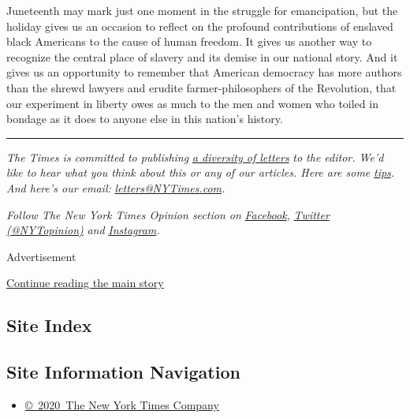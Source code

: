 Juneteenth may mark just one moment in the struggle for emancipation,
but the holiday gives us an occasion to reflect on the profound
contributions of enslaved black Americans to the cause of human freedom.
It gives us another way to recognize the central place of slavery and
its demise in our national story. And it gives us an opportunity to
remember that American democracy has more authors than the shrewd
lawyers and erudite farmer-philosophers of the Revolution, that our
experiment in liberty owes as much to the men and women who toiled in
bondage as it does to anyone else in this nation's history.

\begin{center}\rule{0.5\linewidth}{\linethickness}\end{center}

\emph{The Times is committed to publishing}
\href{https://www.nytimes3xbfgragh.onion/2019/01/31/opinion/letters/letters-to-editor-new-york-times-women.html}{\emph{a
diversity of letters}} \emph{to the editor. We'd like to hear what you
think about this or any of our articles. Here are some}
\href{https://help.nytimes3xbfgragh.onion/hc/en-us/articles/115014925288-How-to-submit-a-letter-to-the-editor}{\emph{tips}}\emph{.
And here's our email:}
\href{mailto:letters@NYTimes.com}{\emph{letters@NYTimes.com}}\emph{.}

\emph{Follow The New York Times Opinion section on}
\href{https://www.facebookcorewwwi.onion/nytopinion}{\emph{Facebook}}\emph{,}
\href{http://twitter.com/NYTOpinion}{\emph{Twitter (@NYTopinion)}}
\emph{and}
\href{https://www.instagram.com/nytopinion/}{\emph{Instagram}}\emph{.}

Advertisement

\protect\hyperlink{after-bottom}{Continue reading the main story}

\hypertarget{site-index}{%
\subsection{Site Index}\label{site-index}}

\hypertarget{site-information-navigation}{%
\subsection{Site Information
Navigation}\label{site-information-navigation}}

\begin{itemize}
\tightlist
\item
  \href{https://help.nytimes3xbfgragh.onion/hc/en-us/articles/115014792127-Copyright-notice}{©~2020~The
  New York Times Company}
\end{itemize}


